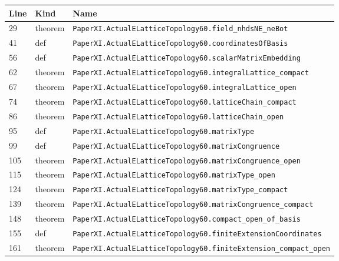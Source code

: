 \documentclass[10pt,oneside]{book}
\begin{document}
\begin{longtable}{@{}p{}p{}p{}@{}}\toprule Line&Kind&Name\\\midrule\endhead

29&theorem&\nolinkurl{PaperXI.ActualELatticeTopology60.field_nhdsNE_neBot}\\

41&def&\nolinkurl{PaperXI.ActualELatticeTopology60.coordinatesOfBasis}\\

56&def&\nolinkurl{PaperXI.ActualELatticeTopology60.scalarMatrixEmbedding}\\

62&theorem&\nolinkurl{PaperXI.ActualELatticeTopology60.integralLattice_compact}\\

67&theorem&\nolinkurl{PaperXI.ActualELatticeTopology60.integralLattice_open}\\

74&theorem&\nolinkurl{PaperXI.ActualELatticeTopology60.latticeChain_compact}\\

86&theorem&\nolinkurl{PaperXI.ActualELatticeTopology60.latticeChain_open}\\

95&def&\nolinkurl{PaperXI.ActualELatticeTopology60.matrixType}\\

99&def&\nolinkurl{PaperXI.ActualELatticeTopology60.matrixCongruence}\\

105&theorem&\nolinkurl{PaperXI.ActualELatticeTopology60.matrixCongruence_open}\\

115&theorem&\nolinkurl{PaperXI.ActualELatticeTopology60.matrixType_open}\\

124&theorem&\nolinkurl{PaperXI.ActualELatticeTopology60.matrixType_compact}\\

139&theorem&\nolinkurl{PaperXI.ActualELatticeTopology60.matrixCongruence_compact}\\

148&theorem&\nolinkurl{PaperXI.ActualELatticeTopology60.compact_open_of_basis}\\

155&def&\nolinkurl{PaperXI.ActualELatticeTopology60.finiteExtensionCoordinates}\\

161&theorem&\nolinkurl{PaperXI.ActualELatticeTopology60.finiteExtension_compact_open}\\

\bottomrule\end{longtable}
\end{document}
